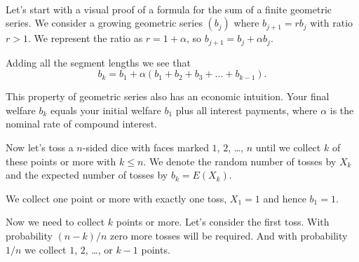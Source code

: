 \documentclass{article}
\theoremstyle{plain}
\begin{document}
\begin{filler}
[white]
\\


\noindent Let's start with a visual proof of a formula for the sum of a  finite geometric series.
We consider a growing geometric series $(b_j)$ where $b_{j + 1} = r b_j$ with ratio $r > 1$.
We represent the ratio as $r = 1 + \alpha$, so $b_{j + 1} = b_j + \alpha b_j$.




		

Adding all the segment lengths we see that
\[
b_{k} = b_1 + \alpha (b_1 + b_2 + b_3 + \ldots + b_{k-1}).
\]

This property of geometric series also has an economic intuition. 
Your final welfare $b_k$ equals your initial welfare $b_1$ plus all interest payments,
where $\alpha$ is the nominal rate of compound interest.


Now let's toss a $n$-sided dice with faces marked $1$, $2$, \ldots, $n$ 
until we collect $k$ of these points or more with $k\leq n$.
We denote the random number of tosses by $X_k$ and the expected number of tosses 
by $b_k = E(X_k)$. 

We collect one point or more with exactly one toss, $X_1 = 1$ and hence $b_1 = 1$. 

Now we need to collect $k$ points or more. Let's consider the first toss.
With probability $(n - k)/n$ zero more tosses will be required. 
And with probability $1/n$ we collect $1$, $2$, \ldots, or $k-1$ points.


\end{filler}
\end{document}
